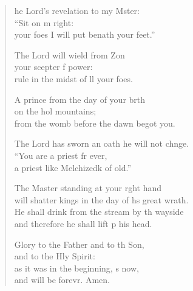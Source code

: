 \settowidth{\versewidth}{will shatter kings in the day of his great wrath.}
\begin{verse}%
  \begin{patverse}
he Lord’s revelation to my Mster:\Flex\\
“Sit on m right:\Med\\
your foes I will put benath your feet.”

The Lord will wield from Z\pointup{\i}on\Flex\\
your scepter f power:\Med\\
rule in the midst of ll your foes.

A prince from the day of your b\pointup{\i}rth\Flex\\
on the hol mountains;\Med\\
from the womb before the dawn  begot you.

The Lord has sworn an oath he will not chnge.\Flex\\
“You are a priest fr ever,\Med\\
a priest like Melchizedk of old.”

The Master standing at your r\pointup{\i}ght hand\Med\\
will shatter kings in the day of h\pointup{\i}s great wrath.\\
He shall drink from the stream by th wayside\Med\\
and therefore he shall lift p his head.

Glory to the Father and to th Son,\Med\\
and to the Hly Spirit:\\
as it was in the beginning, \pointup{\i}s now,\Med\\
and will be forevr. Amen.
  \end{patverse}
\end{verse}
